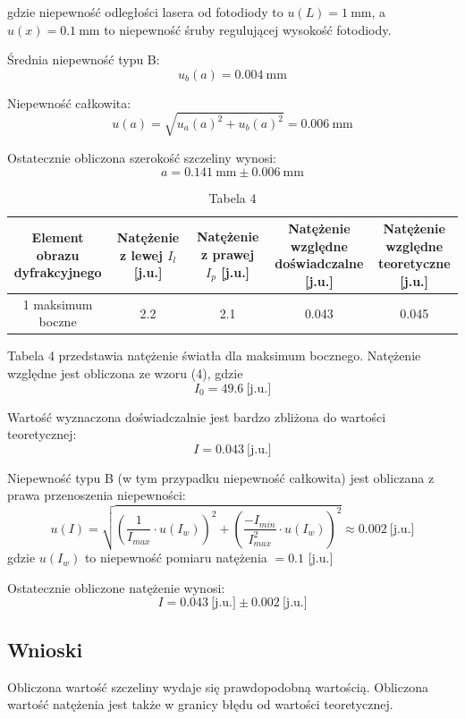 \documentclass{fizykalab}
\begin{document}
{gdzie niepewność odległości lasera od fotodiody to $u(L) = 1 \ \text{mm}$, a $u(x) = 0.1 \ \text{mm}$ to niepewność śruby regulującej wysokość fotodiody. 

Średnia niepewność typu B:
\[ u_b(a) = \SI{0.004}{\milli\meter} \]

Niepewność całkowita:
\[ u(a) = \sqrt{u_a(a)^2 + u_b(a)^2} = \SI{0.006}{\milli\meter}\]

Ostatecznie obliczona szerokość szczeliny wynosi:
\[\boxed{a = \SI{0.141}{\milli\meter} \pm \SI{0.006}{\milli\meter}}\]

\newpage

\begin{table}[!ht]
	\centering
	\begin{tabular}{|c|c|c|c|c|}
		\hline
		\makecell{Element obrazu \\dyfrakcyjnego} & \makecell{Natężenie z \\lewej $I_l$ [j.u.]} & \makecell{Natężenie z \\prawej $I_p$ [j.u.]} & \makecell{Natężenie względne \\doświadczalne [j.u.]} & \makecell{Natężenie względne \\teoretyczne [j.u.]} \\ \hline\hline
		1 maksimum boczne & 2.2 & 2.1 & 0.043 & 0.045 \\ \hline
	\end{tabular}
	\caption*{Tabela 4}
\end{table}

Tabela 4 przedstawia natężenie światła dla maksimum bocznego.
Natężenie względne jest obliczona ze wzoru (4), gdzie
\[ I_0 = 49.6 \ \text{[j.u.]} \]


Wartość wyznaczona doświadczalnie jest bardzo zbliżona do wartości teoretycznej:
\[ \boxed{I = 0.043  \ \text{[j.u.]}} \]

Niepewność typu B (w tym przypadku niepewność całkowita) jest obliczana z prawa przenoszenia niepewności:
\[ u(I) = \sqrt{\left(\frac{1}{I_{max}} \cdot u(I_w)\right)^2 + \left(\frac{-I_{min}}{I_{max}^2} \cdot u(I_w)\right)^2} \approx \boxed{0.002 \ \text{[j.u.]}}\]
gdzie $u(I_w)$ to niepewność pomiaru natężenia $= 0.1$ [j.u.]

Ostatecznie obliczone natężenie wynosi:
\[ \boxed{I = 0.043  \ \text{[j.u.]} \pm 0.002 \ \text{[j.u.]}}\]

\subsection*{Wnioski}
\par
Obliczona wartość szczeliny wydaje się prawdopodobną wartością.
Obliczona wartość natężenia jest także w granicy błędu od wartości teoretycznej.

}
\end{document}
